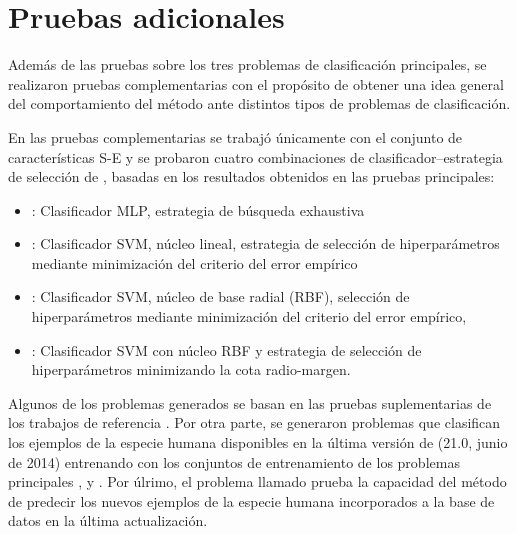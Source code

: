 %
%
%
\section{Pruebas adicionales}
%
Además de las pruebas sobre los tres problemas de clasificación
principales, se realizaron pruebas complementarias con el propósito de
obtener una idea general del comportamiento del método ante distintos
tipos de problemas de clasificación.

En las pruebas complementarias se trabajó únicamente con el conjunto
de características S-E y se probaron cuatro combinaciones de
clasificador--estrategia de selección de , basadas en los
resultados obtenidos en las pruebas principales:
%
\begin{itemize}
\item
  : Clasificador MLP, estrategia de búsqueda
  exhaustiva
\item
  : Clasificador SVM, núcleo lineal, estrategia de
  selección de hiperparámetros mediante minimización del criterio del error
  empírico
\item
  : Clasificador SVM, núcleo de base radial (RBF), selección de
  hiperparámetros mediante minimización del criterio del error empírico,
\item
  : Clasificador SVM con núcleo RBF y estrategia de
  selección de hiperparámetros minimizando la cota radio-margen.
\end{itemize}
%

Algunos de los problemas generados se basan en las pruebas
suplementarias de los trabajos de referencia \cite{xue,ng}.
Por otra parte, se generaron problemas que clasifican los ejemplos de
la especie humana disponibles en la última versión de \dset\mirbase
(21.0, {junio de 2014}) entrenando con los conjuntos de entrenamiento
de los problemas principales \prob\tripletsvm{}, \prob\mipred{} y
\prob\micropred{}.
Por úlrimo, el problema llamado \prob\deltamirbase{} prueba la
capacidad del método de predecir los nuevos ejemplos de la especie
humana incorporados a la base de datos \dset\mirbase en la última
actualización.

